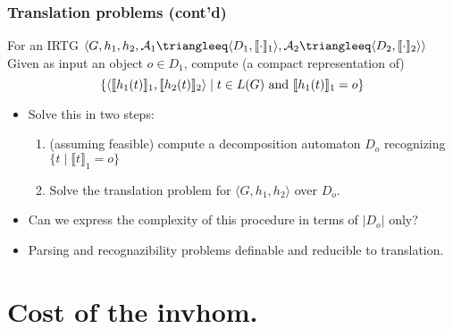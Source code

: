 \documentclass{beamer}
\begin{document}
\begin{frame}
  \frametitle{Translation problems (cont'd)}
  \begin{block}{For an IRTG $\langle G, h_1, h_2, \mathcal{A}_1 \triangleeq \langle D_1, \llbracket \cdot \rrbracket_1 \rangle , \mathcal{A}_2 \triangleeq \langle D_2, \llbracket \cdot \rrbracket_2 \rangle  \rangle$}
    Given as input an object $o \in D_1$, compute (a compact representation of)
    \[ \{ \langle \llbracket h_1(t) \rrbracket_1, \llbracket h_2(t) \rrbracket_2 \rangle \mid t \in L(G) \textnormal{ and } \llbracket h_1(t) \rrbracket_1 = o \} \]
  \end{block}
  \begin{itemize}
  \item Solve this in two steps:
    \begin{enumerate}
    \item (assuming feasible) compute a decomposition automaton $D_o$ recognizing $\{ t \mid \llbracket t \rrbracket_1 = o \}$
    \item Solve the translation problem for $\langle G, h_1, h_2 \rangle$ over $D_o$.
    \end{enumerate}
  \item  \alert{Can we express the complexity of this procedure in terms of $|D_o|$ only?}
  \item Parsing and recognazibility problems definable and reducible to translation.
  \end{itemize}

  
\end{frame}

\section{Cost of the invhom.}
\end{document}
